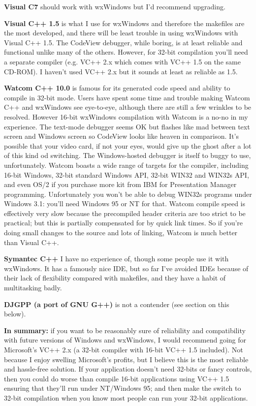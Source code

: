 {\bf Visual C7} should work with wxWindows but I'd recommend upgrading.

{\bf Visual C++ 1.5} is what I use for wxWindows and therefore the makefiles
are the most developed, and there will be least trouble in using wxWindows with
Visual C++ 1.5. The CodeView debugger, while boring, is at least reliable and
functional unlike many of the others. However, for 32-bit compilation you'll
need a separate compiler (e.g. VC++ 2.x which comes with VC++ 1.5 on the same
CD-ROM). I haven't used VC++ 2.x but it sounds at least as reliable as 1.5.

{\bf Watcom C++ 10.0} is famous for its generated code speed and ability
to compile in 32-bit mode. Users have spent some time and trouble making
Watcom C++ and wxWindows see eye-to-eye, although there are still a few
wrinkles to be resolved. However 16-bit wxWindows compilation with
Watcom is a no-no in my experience. The text-mode debugger seems OK but flashes like mad
between text screen and Windows screen so CodeView looks like heaven in
comparison. It's possible that your video card, if not your eyes, would
give up the ghost after a lot of this kind od switching. The Windows-hosted debugger
is itself to buggy to use, unfortunately. Watcom boasts a wide range
of targets for the compiler, including 16-bit Windows, 32-bit standard Windows API,
32-bit WIN32 and WIN32s API, and even OS/2 if you purchase more kit from
IBM for Presentation Manager programming. Unfortunately you won't be
able to debug WIN32s programs under Windows 3.1: you'll need Windows 95 or NT
for that. Watcom compile speed is effectively very slow because the precompiled
header criteria are too strict to be practical; but this is partially
compensated for by quick link times. So if you're doing small changes
to the source and lots of linking, Watcom is much better than Visual C++.

{\bf Symantec C++} I have no experience of, though some people use it with
wxWindows. It has a famously nice IDE, but so far I've avoided IDEs because
of their lack of flexibility compared with makefiles, and they have a habit
of multitasking badly.

{\bf DJGPP (a port of GNU G++)} is not a contender (see section on this below).

{\bf In summary:} if you want to be reasonably sure of reliability and
compatibility with future versions of Windows and wxWindows, I would
recommend going for Microsoft's VC++ 2.x (a 32-bit compiler with 16-bit
VC++ 1.5 included). Not because I enjoy swelling Microsoft's profits, but
I believe this is the most reliable and hassle-free solution. If your
application doesn't need 32-bits or fancy controls, then you could
do worse than compile 16-bit applications using VC++ 1.5 ensuring that
they'll run under NT/Windows 95; and then make the switch to 32-bit
compilation when you know most people can run your 32-bit applications.

